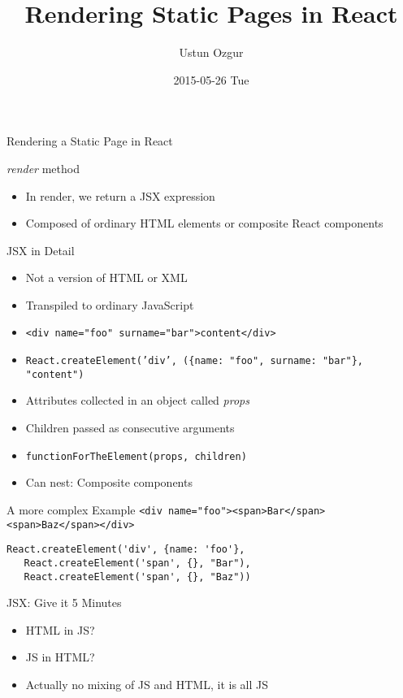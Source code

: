 \documentclass[presentation]{beamer}
\author{Ustun Ozgur}
\date{2015-05-26 Tue}
\title{Rendering Static Pages in React}
\begin{document}
\maketitle

\begin{frame}[label=sec-1]{Rendering a Static Page in React}
\begin{block}{\emph{render} method}
\begin{itemize}
\item In render, we return a JSX expression
\item Composed of ordinary HTML elements or composite React components
\end{itemize}
\end{block}
\end{frame}

\begin{frame}[fragile,label=sec-2]{JSX in Detail}
 \begin{itemize}
\item Not a version of HTML or XML
\item Transpiled to ordinary JavaScript
\item \verb~<div name="foo" surname="bar">content</div>~
\item \texttt{React.createElement('div', (\{name: "foo", surname: "bar"\}, "content")}
\item Attributes collected in an object called \emph{props}
\item Children passed as consecutive arguments
\item \texttt{functionForTheElement(props, children)}
\item Can nest: Composite components
\end{itemize}
\end{frame}

\begin{frame}[fragile,label=sec-3]{A more complex Example}
 \verb~<div name="foo"><span>Bar</span><span>Baz</span></div>~

\begin{verbatim}
React.createElement('div', {name: 'foo'},
   React.createElement('span', {}, "Bar"),
   React.createElement('span', {}, "Baz"))
\end{verbatim}
\end{frame}

\begin{frame}[label=sec-4]{JSX: Give it 5 Minutes}
\begin{itemize}
\item HTML in JS?
\item JS in HTML?
\item Actually no mixing of JS and HTML, it is all JS
\end{itemize}
\end{frame}
\end{document}
